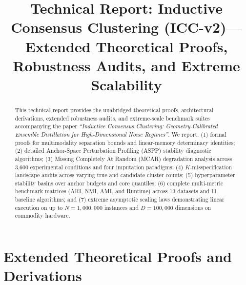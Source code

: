 \documentclass[10pt,journal,compsoc]{IEEEtran}
\begin{document}
\title{Technical Report: Inductive Consensus Clustering (ICC-v2)---Extended Theoretical Proofs, Robustness Audits, and Extreme Scalability}

\author{
}

\maketitle

\begin{abstract}
This technical report provides the unabridged theoretical proofs, architectural derivations, extended robustness audits, and extreme-scale benchmark suites accompanying the paper \textit{``Inductive Consensus Clustering: Geometry-Calibrated Ensemble Distillation for High-Dimensional Noise Regimes''}. We report: (1) formal proofs for multimodality separation bounds and linear-memory determinacy identities; (2) detailed Anchor-Space Perturbation Profiling (ASPP) stability diagnostic algorithms; (3) Missing Completely At Random (MCAR) degradation analysis across 3,600 experimental conditions and four imputation paradigms; (4) $K$-misspecification landscape audits across varying true and candidate cluster counts; (5) hyperparameter stability basins over anchor budgets and core quantiles; (6) complete multi-metric benchmark matrices (ARI, NMI, AMI, and Runtime) across 13 datasets and 11 baseline algorithms; and (7) extreme asymptotic scaling laws demonstrating linear execution on up to $N = 1{,}000{,}000$ instances and $D = 100{,}000$ dimensions on commodity hardware.
\end{abstract}

\section{Extended Theoretical Proofs and Derivations}\label{sec:proofs}
\end{document}
